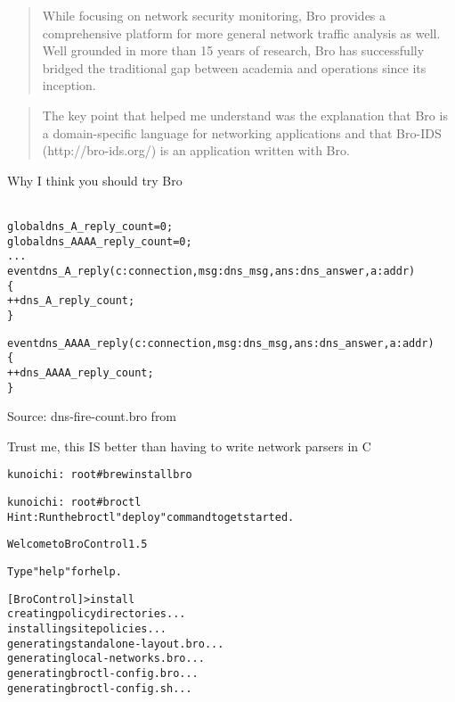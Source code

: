 \documentclass[Screen16to9,17pt]{foils}
\begin{document}


\begin{quote}
While focusing on network security monitoring, Bro provides a comprehensive platform for more general network traffic analysis as well. Well grounded in more than 15 years of research, Bro has successfully bridged the traditional gap between academia and operations since its inception.
\end{quote}



\begin{quote}
	The key point that helped me understand was the explanation that Bro is a
               domain-specific language for networking applications and that Bro-IDS
               (http://bro-ids.org/) is an application written with Bro.
\end{quote}

Why I think you should try Bro\\
\\


\begin{alltt}\small
global dns_A_reply_count=0;
global dns_AAAA_reply_count=0;
...
event dns_A_reply(c: connection, msg: dns_msg, ans: dns_answer, a: addr)
	\{
	++dns_A_reply_count;
	\}

event dns_AAAA_reply(c: connection, msg: dns_msg, ans: dns_answer, a: addr)
	\{
	++dns_AAAA_reply_count;
	\}
\end{alltt}

Source: dns-fire-count.bro from\\
{\small {}}

Trust me, this IS better than having to write network parsers in C \smiley




\begin{alltt}\small
kunoichi:~ root# brew install bro

kunoichi:~ root# broctl
Hint: Run the broctl "deploy" command to get started.

Welcome to BroControl 1.5

Type "help" for help.

[BroControl] > install
creating policy directories ...
installing site policies ...
generating standalone-layout.bro ...
generating local-networks.bro ...
generating broctl-config.bro ...
generating broctl-config.sh ...
\end{alltt}
\end{document}
